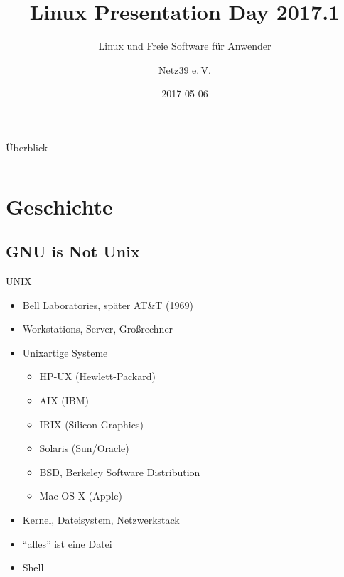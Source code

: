 \documentclass{beamer}
\title{Linux Presentation Day 2017.1}
\subtitle{Linux und Freie Software für Anwender}
\author{Netz39 e.\,V.}
\institute{\url{http://www.netz39.de/}}
\date{2017-05-06}
\begin{document}
\begin{frame}
	\titlepage
\end{frame}

\logo{
    
}

\begin{frame}{Überblick}
    \begin{columns}[T]
        \begin{column}{0.5\textwidth}
            \tableofcontents
        \end{column}
        \begin{column}{0.5\textwidth}
            
        \end{column}
    \end{columns}
\end{frame}

\section{Geschichte}

\frame{\tableofcontents[currentsection]}

\subsection{GNU is Not Unix}

\begin{frame}{UNIX}
    \begin{itemize}
        \item Bell Laboratories, später AT\&T (1969)
        \item Workstations, Server, Großrechner
        \item Unixartige Systeme
            \begin{itemize}
                \item HP-UX (Hewlett-Packard)
                \item AIX (IBM)
                \item IRIX (Silicon Graphics)
                \item Solaris (Sun/Oracle)
                \item BSD, Berkeley Software Distribution
                \item Mac OS X (Apple)
            \end{itemize}
        \item Kernel, Dateisystem, Netzwerkstack
        \item \enquote{alles} ist eine Datei
        \item Shell
    \end{itemize}
\end{frame}
\end{document}
